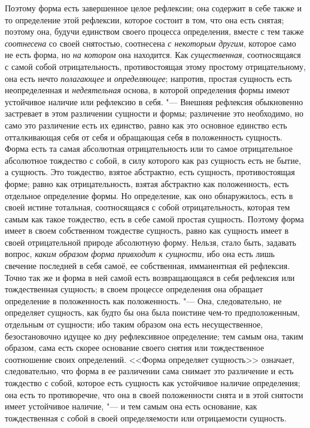 Поэтому форма есть завершенное целое рефлексии; она содержит в себе также и
то определение этой рефлексии, которое состоит в том, что она есть снятая;
поэтому она, будучи единством своего процесса определения, вместе с тем
также {\em соотнесена} со своей снятостью, соотнесена
{\em с некоторым другим}, которое само не есть форма,
но {\em на котором} она находится. Как
{\em существенная}, соотносящаяся с самой собой
отрицательность, противостоящая этому простому отрицательному, она есть
нечто {\em полагающее} и
{\em определяющее}; напротив, простая сущность есть
неопределенная и {\em недеятельная} основа, в которой
определения формы имеют устойчивое наличие или рефлексию в себя. "--- Внешняя
рефлексия обыкновенно застревает в этом различении сущности и формы;
различение это необходимо, но само это различение есть их единство, равно
как это основное единство есть отталкивающая себя от себя и обращающая себя
в положенность сущность. Форма есть та самая абсолютная отрицательность или
то самое отрицательное абсолютное тождество с собой, в силу которого как
раз сущность есть не бытие, а сущность. Это тождество, взятое абстрактно,
есть сущность, противостоящая форме; равно как отрицательность, взятая
абстрактно как положенность, есть отдельное определение формы. Но
определение, как оно обнаружилось, есть в своей истине тотальная,
соотносящаяся с собой отрицательность, которая тем самым как такое
тождество, есть в себе самой простая сущность. Поэтому форма имеет в своем
собственном тождестве сущность, равно как сущность имеет в своей
отрицательной природе абсолютную форму. Нельзя, стало быть, задавать
вопрос, {\em каким образом форма привходит к сущности},
ибо она есть лишь свечение последней в себя самоё, ее собственная,
имманентная ей рефлексия. Точно так же и форма в ней самой есть
возвращающаяся в себя рефлексия или тождественная сущность; в своем
процессе определения она обращает определение в положенность как
положенность. "--- Она, следовательно, не определяет сущность, как будто бы
она была поистине чем-то предположенным, отдельным от сущности; ибо таким
образом она есть несущественное, безостановочно идущее ко дну рефлексивное
определение; тем самым она, таким образом, сама есть скорее основание
своего снятия или тождественное соотношение своих определений. <<Форма
определяет сущность>> означает, следовательно, что форма в ее различении
сама снимает это различение и есть тождество с собой, которое есть сущность
как устойчивое наличие определения; она есть то противоречие, что она в
своей положенности снята и в этой снятости имеет устойчивое наличие, "--- и
тем самым она есть основание, как тождественная с собой в своей
определяемости или отрицаемости сущность.

